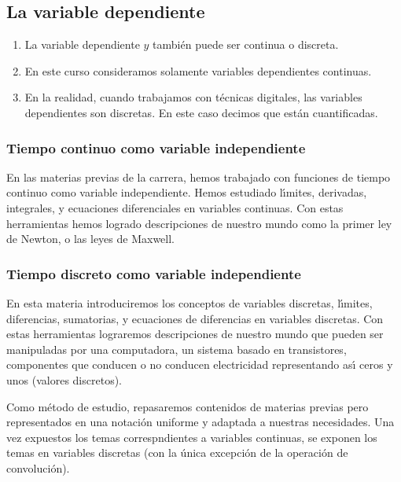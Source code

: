 \subsection{La variable dependiente}

\begin{enumerate}
\item La variable dependiente $y$ tambi\'{e}n puede ser continua o
  discreta.

\item En este curso consideramos solamente variables dependientes
  continuas.

\item En la realidad, cuando trabajamos con t\'{e}cnicas digitales,
  las variables dependientes son discretas. En este caso decimos que
  est\'{a}n cuantificadas.
\end{enumerate}

\subsubsection{Tiempo continuo como variable independiente}

En las materias previas de la carrera, hemos trabajado con funciones
de tiempo continuo como variable independiente. Hemos estudiado
l\'{\i}mites, derivadas, integrales, y ecuaciones diferenciales en
variables continuas. Con estas herramientas hemos logrado
descripciones de nuestro mundo como la primer ley de Newton, o las
leyes de Maxwell.

\subsubsection{Tiempo discreto como variable independiente}

En esta materia introduciremos los conceptos de variables discretas,
l\'{\i}mites, diferencias, sumatorias, y ecuaciones de diferencias en
variables discretas. Con estas herramientas lograremos descripciones
de nuestro mundo que pueden ser manipuladas por una computadora, un
sistema basado en transistores, componentes que conducen o no conducen
electricidad representando as\'{\i} ceros y unos (valores discretos).

Como m\'{e}todo de estudio, repasaremos contenidos de materias previas
pero representados en una notaci\'{o}n uniforme y adaptada a nuestras
necesidades. Una vez expuestos los temas correspndientes a variables
continuas, se exponen los temas en variables discretas (con la
\'{u}nica excepci\'{o}n de la operaci\'{o}n de convoluci\'{o}n).



